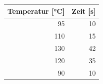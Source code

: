 \documentclass[a4paper,11pt]{article}
\newif\ifshowme
\begin{document}
\begin{center}\begin{tabular}{r|r}
\rowcolor{miugray}
Temperatur [°C] & Zeit [s] \\ \hline
95 & 10 \\
110 & 15 \\
130 & 42 \\
120 & 35 \\
90 & 10 \\

\end{tabular}\end{center}

\ifshowme
\antwort{
\begin{align*}
F_0  &= &F_t \cdot 10^{\frac{T_2-T_1}{z}} \qquad && \\ \\
F_01 &= &10 ~\text{s} \cdot 10^{\frac{95-121,1}{10}}  \qquad &= 0,025 ~\text{s} \\
F_02 &= &15 ~\text{s} \cdot 10^{\frac{110-121,1}{10}} \qquad &= 1,16 ~\text{s} \\
F_03 &= &42 ~\text{s} \cdot 10^{\frac{130-121,1}{10}} \qquad &= 326,02 ~\text{s} \\
F_04 &= &35 ~\text{s} \cdot 10^{\frac{120-121,1}{10}} \qquad &= 27,17 ~\text{s} \\
F_05 &= &10 ~\text{s} \cdot 10^{\frac{90-121,1}{10}}  \qquad &= 0,008 ~\text{s} \\
\end{align*}

Summe aller Zeiten:
\begin{align*}
\sum_{i=1}^{5} F_{0i} = 5,91 ~\text{min}
\end{align*}
}
\else
\fi
\end{document}
